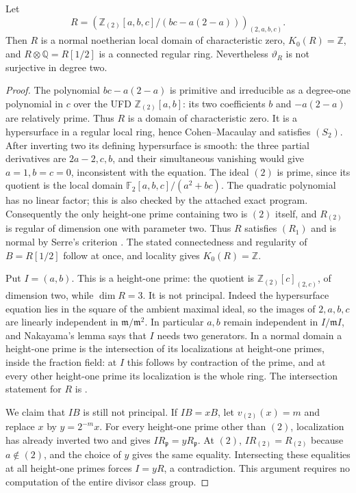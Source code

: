 \begin{proposition}
\label{C:normal_domain_counterexample}
Let
\[
 R=\left(\mathbb Z_{(2)}[a,b,c]/(bc-a(2-a))\right)_{(2,a,b,c)}.
\]
Then $R$ is a normal noetherian local domain of characteristic zero,
$K_0(R)=\mathbb Z$, and $R\otimes\mathbb Q=R[1/2]$ is a connected regular
ring. Nevertheless $\vartheta_R$ is not surjective in degree two.
\end{proposition}
\begin{proof}
The polynomial $bc-a(2-a)$ is primitive and irreducible as a degree-one
polynomial in $c$ over the UFD $\mathbb Z_{(2)}[a,b]$: its two coefficients
$b$ and $-a(2-a)$ are relatively prime. Thus $R$ is a domain of
characteristic zero. It is a hypersurface in a regular local ring, hence
Cohen--Macaulay and satisfies $(S_2)$. After inverting two its defining
hypersurface is smooth: the three partial derivatives are $2a-2,c,b$,
and their simultaneous vanishing would give $a=1,b=c=0$, inconsistent
with the equation. The ideal $(2)$ is prime, since its quotient is the
local domain $\mathbb F_2[a,b,c]/(a^2+bc)$. The quadratic polynomial has
no linear factor; this is also checked by the attached exact program.
Consequently the only height-one prime containing two is $(2)$ itself,
and $R_{(2)}$ is regular of dimension one with parameter two. Thus $R$
satisfies $(R_1)$ and is normal by Serre's criterion
\cite[Tag 031S]{C-StacksNormal}. The stated connectedness and regularity of
$B=R[1/2]$ follow at once, and locality gives $K_0(R)=\mathbb Z$.

Put $I=(a,b)$. This is a height-one prime: the quotient is
$\mathbb Z_{(2)}[c]_{(2,c)}$, of dimension two, while $\dim R=3$.
It is not principal. Indeed the hypersurface equation lies in the square
of the ambient maximal ideal, so the images of $2,a,b,c$ are linearly
independent in $\mathfrak m/\mathfrak m^2$. In particular $a,b$ remain
independent in $I/\mathfrak m I$, and Nakayama's lemma says that $I$ needs
two generators. In a normal domain a height-one prime is the intersection
of its localizations at height-one primes, inside the fraction field:
at $I$ this follows by contraction of the prime, and at every other
height-one prime its localization is the whole ring. The intersection
statement for $R$ is \cite[Tag 031T]{C-StacksNormal}.

We claim that $IB$ is still not principal. If $IB=xB$, let $v_{(2)}(x)=m$
and replace $x$ by $y=2^{-m}x$. For every height-one prime other than $(2)$,
localization has already inverted two and gives $I R_{\mathfrak p}=y
R_{\mathfrak p}$. At $(2)$, $I R_{(2)}=R_{(2)}$ because $a\notin(2)$,
and the choice of $y$ gives the same equality. Intersecting these equalities
at all height-one primes forces $I=yR$, a contradiction. This argument
requires no computation of the entire divisor class group.


\end{proof}
